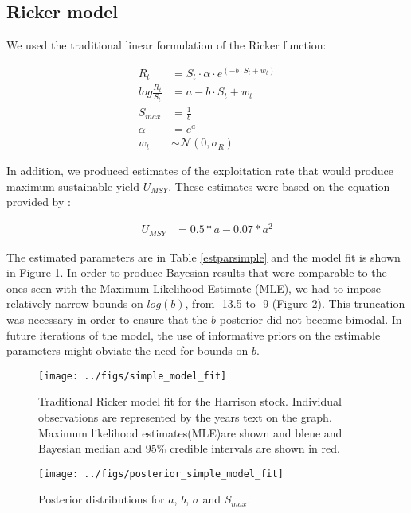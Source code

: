\documentclass{article}
\begin{document}
\subsection{Ricker model}

We used the traditional linear formulation of the Ricker function:

\begin{align} 
R_t &= S_t \cdot \alpha \cdot e^{(-b\cdot S_t + w_t)}  \\ 
log\frac{R_t}{S_t} &= a-b\cdot S_t + w_t \\
S_{max} &= \frac{1}{b}\\
\alpha &= e^{a}\\
w_t &\sim \mathcal{N}(0,\sigma_R)
\end{align}

In addition, we produced estimates of the exploitation rate that would produce maximum sustainable yield $U_{MSY}$. These estimates were based on the equation provided by \citet{hilborn_quantitative_1992}: 

\begin{align} 
U_{MSY} &=0.5*a-0.07*a^2
\end{align}

The estimated parameters are in Table \ref{estparsimple} and the model fit is shown in Figure \ref{simple_fit}. In order to produce Bayesian results that were comparable to the ones seen with the Maximum Likelihood Estimate (MLE), we had to impose relatively narrow bounds on $log(b)$, from -13.5 to -9 (Figure \ref{posterior_simple}). This truncation was necessary in order to ensure that the $b$ posterior did not become bimodal. In future iterations of the model, the use of informative priors on the estimable parameters might obviate the need for bounds on $b$.  





\begin{figure}[ht]
  \centering
  \texttt{[image: ../figs/simple\_model\_fit]}
  \caption{Traditional Ricker model fit for the Harrison stock. Individual observations are represented by the years text on the graph. Maximum likelihood estimates(MLE)are shown and bleue and Bayesian median and 95\% credible intervals are shown in red. }
\label{simple_fit}
\end{figure}


\begin{figure}[ht]
  \centering
  \texttt{[image: ../figs/posterior\_simple\_model\_fit]}
  \caption{Posterior distributions for $a$, $b$, $\sigma$ and $S_{max}$. }
\label{posterior_simple}
\end{figure}
\end{document}
